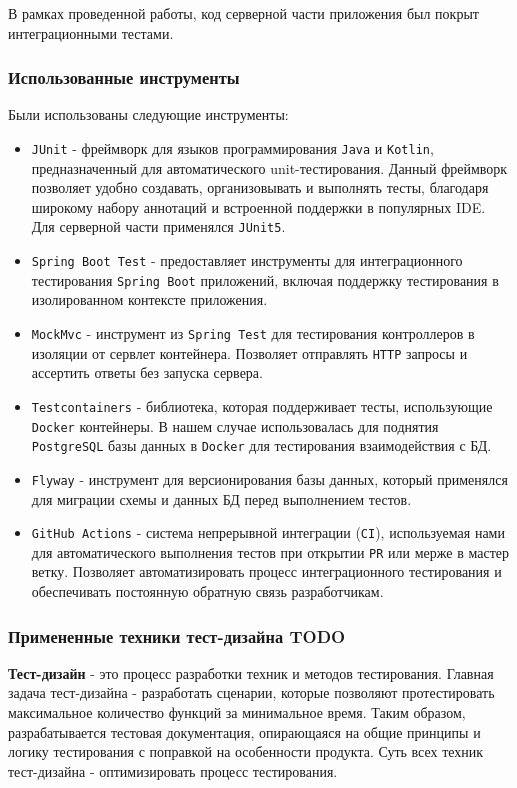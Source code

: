 \documentclass[a4paper, 14pt]{article}
\begin{document}
В рамках проведенной работы, код серверной части приложения был покрыт интеграционными тестами.

\subsubsection{Использованные инструменты}

Были использованы следующие инструменты:

\begin{itemize}
    \item \texttt{JUnit} - фреймворк для языков программирования \texttt{Java} и \texttt{Kotlin}, предназначенный для автоматического unit-тестирования. Данный фреймворк позволяет удобно создавать, организовывать и выполнять тесты, благодаря широкому набору аннотаций и встроенной поддержки в популярных IDE. Для серверной части применялся \texttt{JUnit5}.
    \item \texttt{Spring Boot Test} - предоставляет инструменты для интеграционного тестирования \texttt{Spring Boot} приложений, включая поддержку тестирования в изолированном контексте приложения.
    \item \texttt{MockMvc} - инструмент из \texttt{Spring Test} для тестирования контроллеров в изоляции от сервлет контейнера. Позволяет отправлять \texttt{HTTP} запросы и ассертить ответы без запуска сервера.
    \item \texttt{Testcontainers} - библиотека, которая поддерживает тесты, использующие \texttt{Docker} контейнеры. В нашем случае использовалась для поднятия \texttt{PostgreSQL} базы данных в \texttt{Docker} для тестирования взаимодействия с БД.
    \item \texttt{Flyway} - инструмент для версионирования базы данных, который применялся для миграции схемы и данных БД перед выполнением тестов.
    \item \texttt{GitHub Actions} - система непрерывной интеграции (\texttt{CI}), используемая нами для автоматического выполнения тестов при открытии \texttt{PR} или мерже в мастер ветку. Позволяет автоматизировать процесс интеграционного тестирования и обеспечивать постоянную обратную связь разработчикам.
\end{itemize}

\subsubsection{Примененные техники тест-дизайна TODO}

\textbf{Тест-дизайн} - это процесс разработки техник и методов тестирования. Главная задача тест-дизайна - разработать сценарии, которые позволяют протестировать максимальное количество функций за минимальное время. Таким образом, разрабатывается тестовая документация, опирающаяся на общие принципы и логику тестирования с поправкой на особенности продукта. Суть всех техник тест-дизайна - оптимизировать процесс тестирования.
\end{document}
